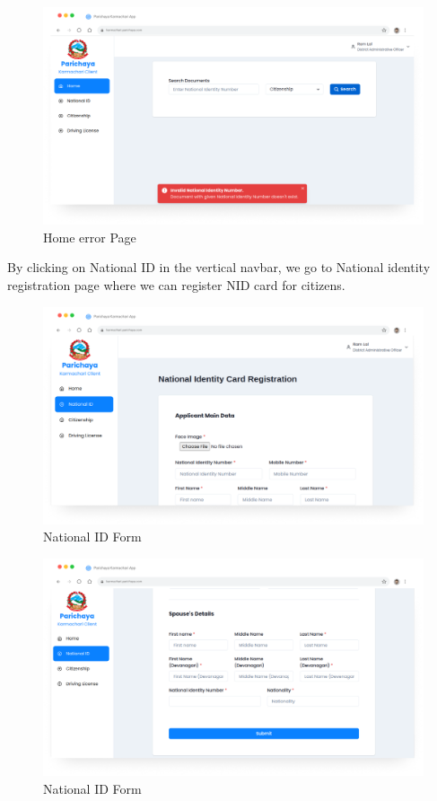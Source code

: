           \begin{figure}[H]
        \centering
        \includegraphics[width=0.8\linewidth]{images/results/web/WebHomeError.png}
        \caption[Home error Page ]{Home error Page }
        \label{fig:WebHomeError.png}
        \end{figure}


    By clicking on National ID in the vertical navbar, we go to National identity registration page where we can register NID card for citizens. 
   
        \begin{figure}[H]
        \centering
        \includegraphics[width=0.8\linewidth]{images/results/web/WebNationalIDCardRegistration1.png}
        \caption[National ID Form]{National ID Form}
        \label{fig:WebNationalIDCardRegistration1.png}
        \end{figure}

           \begin{figure}[H]
        \centering
        \includegraphics[width=0.8\linewidth]{images/results/web/WebNationalIDCardRegistration2.png}
        \caption[National ID Form]{National ID Form}
        \label{fig:WebNationalIDCardRegistration2.png}
        \end{figure}


